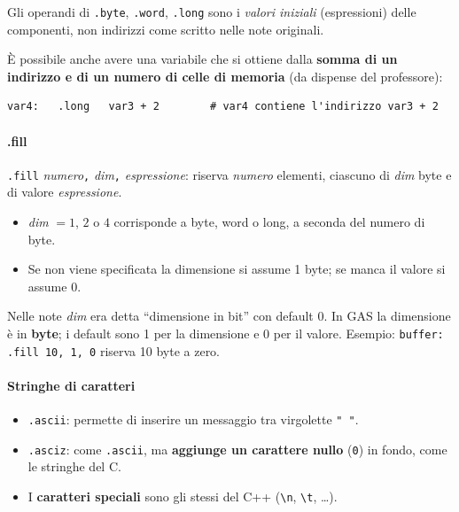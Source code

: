 \documentclass[11pt,a4paper]{article}
\begin{document}
\begin{integrazione}
Gli operandi di \texttt{.byte}, \texttt{.word}, \texttt{.long} sono i \emph{valori iniziali} (espressioni) delle componenti, non indirizzi come scritto nelle note originali.
\end{integrazione}

È possibile anche avere una variabile che si ottiene dalla \textbf{somma di un indirizzo e di un numero di celle di memoria} (da dispense del professore):
\begin{lstlisting}
var4:   .long   var3 + 2        # var4 contiene l'indirizzo var3 + 2
\end{lstlisting}

\paragraph*{.fill}

\texttt{.fill} \emph{numero}\texttt{,} \emph{dim}\texttt{,} \emph{espressione}: riserva \emph{numero} elementi, ciascuno di \emph{dim} byte e di valore \emph{espressione}.
\begin{itemize}[leftmargin=*]
  \item \emph{dim} $=1$, $2$ o $4$ corrisponde a byte, word o long, a seconda del numero di byte.
  \item Se non viene specificata la dimensione si assume 1 byte; se manca il valore si assume 0.
\end{itemize}

\begin{integrazione}
Nelle note \emph{dim} era detta ``dimensione in bit'' con default 0. In GAS la dimensione è in \textbf{byte}; i default sono 1 per la dimensione e 0 per il valore. Esempio: \texttt{buffer: .fill 10, 1, 0} riserva 10 byte a zero.
\end{integrazione}

\paragraph*{Stringhe di caratteri}

\begin{itemize}[leftmargin=*]
  \item \texttt{.ascii}: permette di inserire un messaggio tra virgolette \texttt{" "}.
  \item \texttt{.asciz}: come \texttt{.ascii}, ma \textbf{aggiunge un carattere nullo} (\texttt{0}) in fondo, come le stringhe del C.
  \item I \textbf{caratteri speciali} sono gli stessi del C++ (\texttt{\textbackslash n}, \texttt{\textbackslash t}, \ldots).
\end{itemize}
\end{document}
